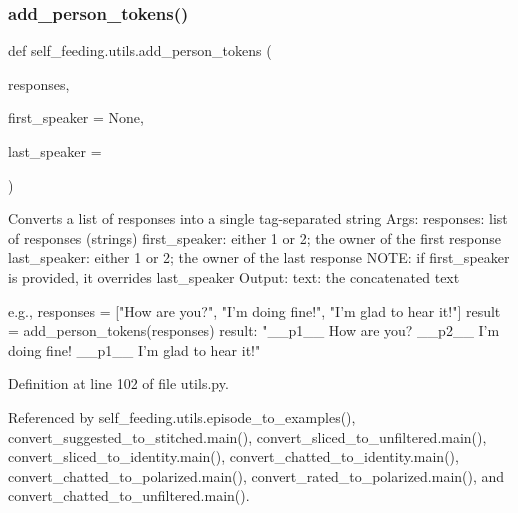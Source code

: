 \subsubsection{\texorpdfstring{add\+\_\+person\+\_\+tokens()}{add\_person\_tokens()}}
{\footnotesize\ttfamily def self\+\_\+feeding.\+utils.\+add\+\_\+person\+\_\+tokens (\begin{DoxyParamCaption}\item[{}]{responses,  }\item[{}]{first\+\_\+speaker = {\ttfamily None},  }\item[{}]{last\+\_\+speaker = {} }\end{DoxyParamCaption})}

\begin{DoxyVerb}Converts a list of responses into a single tag-separated string
Args:
    responses: list of responses (strings)
    first_speaker: either 1 or 2; the owner of the first response
    last_speaker: either 1 or 2; the owner of the last response
        NOTE: if first_speaker is provided, it overrides last_speaker
Output:
    text: the concatenated text

e.g.,
responses = ["How are you?", "I'm doing fine!", "I'm glad to hear it!"]
result = add_person_tokens(responses)
result: "__p1__ How are you? __p2__ I'm doing fine! __p1__ I'm glad to
    hear it!"
\end{DoxyVerb}
 

Definition at line 102 of file utils.\+py.



Referenced by self\+\_\+feeding.\+utils.\+episode\+\_\+to\+\_\+examples(), convert\+\_\+suggested\+\_\+to\+\_\+stitched.\+main(), convert\+\_\+sliced\+\_\+to\+\_\+unfiltered.\+main(), convert\+\_\+sliced\+\_\+to\+\_\+identity.\+main(), convert\+\_\+chatted\+\_\+to\+\_\+identity.\+main(), convert\+\_\+chatted\+\_\+to\+\_\+polarized.\+main(), convert\+\_\+rated\+\_\+to\+\_\+polarized.\+main(), and convert\+\_\+chatted\+\_\+to\+\_\+unfiltered.\+main().

